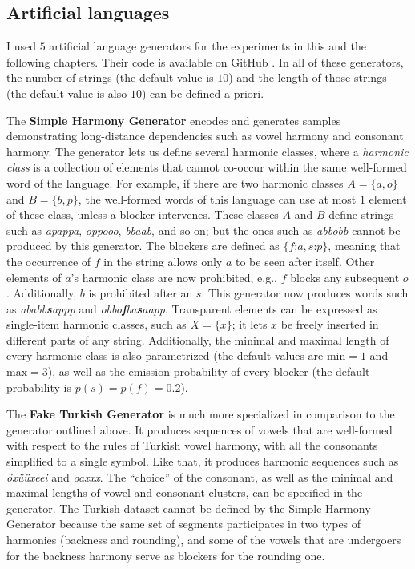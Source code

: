 \subsection{Artificial languages}
\label{secartlang}

I used $5$ artificial language generators for the experiments in this and the following chapters. Their code is available on GitHub \href{https://github.com/alenaks/subregular-experiments}{\faGithub} \citep{GHsubex}.
In all of these generators, the number of strings (the default value is $10$) and the length of those strings (the default value is also $10$) can be defined a priori.


The \textbf{Simple Harmony Generator} encodes and generates samples demonstrating long-distance dependencies such as vowel harmony and consonant harmony.
The generator lets us define several harmonic classes, where a \emph{harmonic class} is a collection of elements that cannot co-occur within the same well-formed word of the language.
For example, if there are two harmonic classes $A = \{a, o\}$ and $B = \{b, p\}$, the well-formed words of this language can use at most $1$ element of these class, unless a blocker intervenes.
These classes $A$ and $B$ define strings such as \emph{apappa}, \emph{oppooo}, \emph{bbaab}, and so on; but the ones such as \emph{abbobb} cannot be produced by this generator.
The blockers are defined as $\{f$:$a, s$:$p\}$, meaning that the occurrence of $f$ in the string allows only $a$ to be seen after itself.
Other elements of $a$'s harmonic class are now prohibited, e.g., $f$ blocks any subsequent $o$.
Additionally, $b$ is prohibited after an $s$.
This generator now produces words such as \emph{ababb\textbf{s}appp} and \emph{obbo\textbf{f}ba\textbf{s}aapp}.
Transparent elements can be expressed as single-item harmonic classes, such as $X = \{x\}$; it lets $x$ be freely inserted in different parts of any string.
Additionally, the minimal and maximal length of every harmonic class is also parametrized (the default values are $\textrm{min} = 1$ and $\textrm{max} = 3$), as well as the emission probability of every blocker (the default probability is $p(s) = p(f) = 0.2$).


The \textbf{Fake Turkish Generator} is much more specialized in comparison to the generator outlined above.
It produces sequences of vowels that are well-formed with respect to the rules of Turkish vowel harmony, with all the consonants simplified to a single symbol.
Like that, it produces harmonic sequences such as \emph{\"ox\"u\"uxeei} and \emph{oa\textsci xxx\textsci\textsci}.
The ``choice'' of the consonant, as well as the minimal and maximal lengths of vowel and consonant clusters, can be specified in the generator.
The Turkish dataset cannot be defined by the Simple Harmony Generator because the same set of segments participates in two types of harmonies (backness and rounding), and some of the vowels that are undergoers for the backness harmony serve as blockers for the rounding one.


